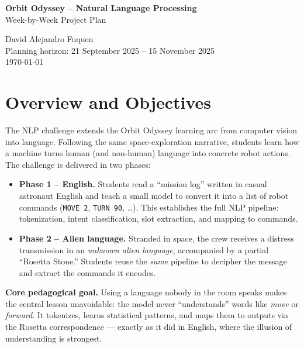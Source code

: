 \documentclass[a4]{article}
\begin{document}
\thispagestyle{fancy}

\begin{center}
    \textbf{\large Orbit Odyssey -- Natural Language Processing} \\
    {Week-by-Week Project Plan}

    \vspace{0.7em}

    David Alejandro Fuquen \\

    {\small Planning horizon: 21 September 2025 -- 15 November 2025} \\
    {\small \today}
\end{center}

\vspace{0.5em}

\section{Overview and Objectives}

The NLP challenge extends the Orbit Odyssey learning arc from computer vision
into language. Following the same space-exploration narrative, students learn
how a machine turns human (and non-human) language into concrete robot actions.
The challenge is delivered in two phases:

\begin{itemize}[leftmargin=*]
    \item \textbf{Phase 1 -- English.} Students read a ``mission log'' written in
    casual astronaut English and teach a small model to convert it into a list of
    robot commands (\texttt{MOVE~2}, \texttt{TURN~90}, \ldots). This establishes
    the full NLP pipeline: tokenization, intent classification, slot extraction,
    and mapping to commands.
    \item \textbf{Phase 2 -- Alien language.} Stranded in space, the crew receives
    a distress transmission in an \emph{unknown alien language}, accompanied by a
    partial ``Rosetta Stone.'' Students reuse the \emph{same} pipeline to decipher
    the message and extract the commands it encodes.
\end{itemize}

\noindent\textbf{Core pedagogical goal.} Using a language nobody in the room
speaks makes the central lesson unavoidable: the model never ``understands''
words like \emph{move} or \emph{forward}. It tokenizes, learns statistical
patterns, and maps them to outputs via the Rosetta correspondence --- exactly as
it did in English, where the illusion of understanding is strongest.
\end{document}
